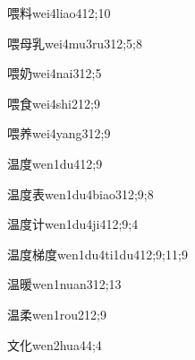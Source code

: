 \begin{verbete}{喂料}{wei4liao4}{12;10}
\end{verbete}

\begin{verbete}{喂母乳}{wei4mu3ru3}{12;5;8}
\end{verbete}

\begin{verbete}{喂奶}{wei4nai3}{12;5}
\end{verbete}

\begin{verbete}{喂食}{wei4shi2}{12;9}
\end{verbete}

\begin{verbete}{喂养}{wei4yang3}{12;9}
\end{verbete}

\begin{verbete}{温度}{wen1du4}{12;9}
\end{verbete}

\begin{verbete}{温度表}{wen1du4biao3}{12;9;8}
\end{verbete}

\begin{verbete}{温度计}{wen1du4ji4}{12;9;4}
\end{verbete}

\begin{verbete}{温度梯度}{wen1du4ti1du4}{12;9;11;9}
\end{verbete}

\begin{verbete}{温暖}{wen1nuan3}{12;13}
\end{verbete}

\begin{verbete}{温柔}{wen1rou2}{12;9}
\end{verbete}

\begin{verbete}{文化}{wen2hua4}{4;4}
\end{verbete}


